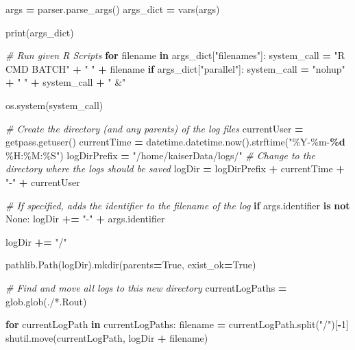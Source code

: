 \documentclass[
]{book}
\newenvironment{Shaded}{\begin{snugshade}}{\end{snugshade}}
\newcommand{\BuiltInTok}[1]{#1}
\newcommand{\CommentTok}[1]{\textcolor[rgb]{0.56,0.35,0.01}{\textit{#1}}}
\newcommand{\ControlFlowTok}[1]{\textcolor[rgb]{0.13,0.29,0.53}{\textbf{#1}}}
\newcommand{\DecValTok}[1]{\textcolor[rgb]{0.00,0.00,0.81}{#1}}
\newcommand{\KeywordTok}[1]{\textcolor[rgb]{0.13,0.29,0.53}{\textbf{#1}}}
\newcommand{\NormalTok}[1]{#1}
\newcommand{\OperatorTok}[1]{\textcolor[rgb]{0.81,0.36,0.00}{\textbf{#1}}}
\newcommand{\SpecialCharTok}[1]{\textcolor[rgb]{0.81,0.36,0.00}{\textbf{#1}}}
\newcommand{\StringTok}[1]{\textcolor[rgb]{0.31,0.60,0.02}{#1}}
\newcommand{\VariableTok}[1]{\textcolor[rgb]{0.00,0.00,0.00}{#1}}
\begin{document}
\begin{Shaded}
\begin{Highlighting}[]
\NormalTok{args }\OperatorTok{=}\NormalTok{ parser.parse\_args()}
\NormalTok{args\_dict }\OperatorTok{=} \BuiltInTok{vars}\NormalTok{(args)}

\BuiltInTok{print}\NormalTok{(args\_dict)}

\CommentTok{\# Run given R Scripts}
\ControlFlowTok{for}\NormalTok{ filename }\KeywordTok{in}\NormalTok{ args\_dict[}\StringTok{"filenames"}\NormalTok{]:}
\NormalTok{  system\_call }\OperatorTok{=} \StringTok{"R CMD BATCH"} \OperatorTok{+} \StringTok{" "} \OperatorTok{+}\NormalTok{ filename}
  \ControlFlowTok{if}\NormalTok{ args\_dict[}\StringTok{"parallel"}\NormalTok{]: }
\NormalTok{    system\_call }\OperatorTok{=} \StringTok{"nohup"} \OperatorTok{+} \StringTok{" "} \OperatorTok{+}\NormalTok{ system\_call }\OperatorTok{+} \StringTok{" \&"}

\NormalTok{  os.system(system\_call)}

\CommentTok{\# Create the directory (and any parents) of the log files}
\NormalTok{currentUser }\OperatorTok{=}\NormalTok{ getpass.getuser()}
\NormalTok{currentTime }\OperatorTok{=}\NormalTok{ datetime.datetime.now().strftime(}\StringTok{"\%Y{-}\%m{-}}\SpecialCharTok{\%d}\StringTok{ \%H:\%M:\%S"}\NormalTok{)}
\NormalTok{logDirPrefix }\OperatorTok{=} \StringTok{"/home/kaiserData/logs/"} \CommentTok{\# Change to the directory where the logs should be saved}
\NormalTok{logDir }\OperatorTok{=}\NormalTok{ logDirPrefix }\OperatorTok{+}\NormalTok{ currentTime }\OperatorTok{+} \StringTok{"{-}"} \OperatorTok{+}\NormalTok{ currentUser }

\CommentTok{\# If specified, adds the identifier to the filename of the log}
\ControlFlowTok{if}\NormalTok{ args.identifier }\KeywordTok{is} \KeywordTok{not} \VariableTok{None}\NormalTok{:}
\NormalTok{  logDir }\OperatorTok{+=} \StringTok{"{-}"} \OperatorTok{+}\NormalTok{ args.identifier}

\NormalTok{logDir }\OperatorTok{+=} \StringTok{"/"}

\NormalTok{pathlib.Path(logDir).mkdir(parents}\OperatorTok{=}\VariableTok{True}\NormalTok{, exist\_ok}\OperatorTok{=}\VariableTok{True}\NormalTok{)}

\CommentTok{\# Find and move all logs to this new directory}
\NormalTok{currentLogPaths }\OperatorTok{=}\NormalTok{ glob.glob(}\StringTok{\textquotesingle{}./*.Rout\textquotesingle{}}\NormalTok{)}

\ControlFlowTok{for}\NormalTok{ currentLogPath }\KeywordTok{in}\NormalTok{ currentLogPaths:}
\NormalTok{  filename }\OperatorTok{=}\NormalTok{ currentLogPath.split(}\StringTok{"/"}\NormalTok{)[}\OperatorTok{{-}}\DecValTok{1}\NormalTok{]}
\NormalTok{  shutil.move(currentLogPath, logDir }\OperatorTok{+}\NormalTok{ filename)}
\end{Highlighting}
\end{Shaded}
\end{document}
